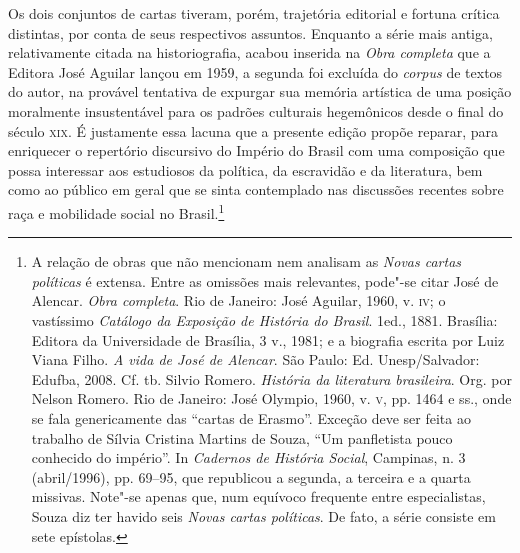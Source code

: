 Os dois conjuntos de cartas tiveram, porém, trajetória editorial e
fortuna crítica distintas, por conta de seus respectivos assuntos.
Enquanto a série mais antiga, relativamente citada na historiografia,
acabou inserida na \textit{Obra completa} que a Editora José Aguilar
lançou em 1959, a segunda foi excluída do \textit{corpus} de textos do
autor, na provável tentativa de expurgar sua memória artística de uma
posição moralmente insustentável para os padrões culturais hegemônicos
desde o final do século \textsc{xix}. É justamente essa lacuna que a presente
edição propõe reparar, para enriquecer o repertório discursivo do
Império do Brasil com uma composição que possa interessar aos
estudiosos da política, da escravidão e da literatura, bem como ao
público em geral que se sinta contemplado nas discussões recentes sobre
raça e mobilidade social no Brasil.\footnote{ A relação de obras que não mencionam 
nem analisam as \textit{Novas cartas políticas} é extensa. Entre as omissões mais relevantes, 
pode"-se citar José de Alencar. \textit{Obra completa}. Rio de Janeiro: José Aguilar, 1960, v. \textsc{iv}; 
o vastíssimo \textit{Catálogo da Exposição de História do Brasil}. 1\ai ed., 1881. Brasília: Editora 
da Universidade de Brasília, 3 v., 1981; e a biografia escrita por Luiz Viana Filho. 
\textit{A vida de José de Alencar}. São Paulo: Ed. Unesp/Salvador: Edufba, 2008. Cf. tb. Silvio Romero. 
\textit{História da literatura brasileira}. Org. por Nelson Romero. Rio de Janeiro: José Olympio, 1960, 
v. \textsc{v}, pp. 1464 e ss., onde se fala genericamente das ``cartas de Erasmo''. Exceção deve ser feita 
ao trabalho de Sílvia Cristina Martins de Souza, ``Um panfletista pouco conhecido do império''. 
In \textit{Cadernos de História Social}, Campinas, n. 3 (abril/1996), pp. 69--95, que republicou a segunda, 
a terceira e a quarta missivas. Note"-se apenas que, num equívoco frequente entre especialistas, 
Souza diz ter havido seis \textit{Novas cartas políticas}. De fato, a série consiste em sete epístolas.}

